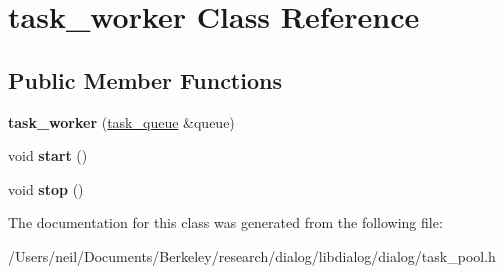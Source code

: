 \hypertarget{classtask__worker}{}\section{task\+\_\+worker Class Reference}
\label{classtask__worker}
\subsection*{Public Member Functions}
\begin{DoxyCompactItemize}
\item 
\mbox{\label{classtask__worker_add80ef340c383360fe6ac99f048a7212}} 
{\bfseries task\+\_\+worker} (\hyperlink{classtask__queue}{task\+\_\+queue} \&queue)
\item 
\mbox{\label{classtask__worker_aa33aec83ef4e75f6a715176a31913d70}} 
void {\bfseries start} ()
\item 
\mbox{\label{classtask__worker_aaa4b11b564b47d366e3acbe0e8205595}} 
void {\bfseries stop} ()
\end{DoxyCompactItemize}


The documentation for this class was generated from the following file\+:\begin{DoxyCompactItemize}
\item 
/\+Users/neil/\+Documents/\+Berkeley/research/dialog/libdialog/dialog/task\+\_\+pool.\+h\end{DoxyCompactItemize}

